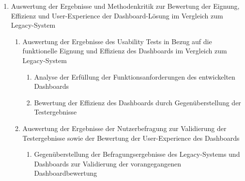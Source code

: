 \begin{enumerate}
\begin{enumerate}
\begin{enumerate}
            \item Erstellung eines Usability-Tests zur Überprüfung der identifizierten Anforderungen wie Funktionsvollständigkeit, Nutzerfreundlichkeit und Effizienz
            \item Zusammenfassung der Testergebnisse im Rahmen des Legacy-Systems
            \item Zusammenfassung der Testergebnisse im Rahmen des Dashboards
        \end{enumerate}
        \item Umsetzung einer Nutzerbefragung als zusätzliche Validierung der Nutzerfreundlichkeit und Gewährleistung der Nutzerzufriedenheit im Vergleich zum Legacy-System
        \begin{enumerate}
            \item Erstellung eines Fragebogens nach ISO 9241-110 zur Validierung der gegebenen Anforderungen wie User-Experience und Nutzerzufriedenheit
            \item Zusammenfassung der Ergebnisse des Fragebogens in Bezug auf das Legacy-System
            \item Zusammenfassung der Ergebnisse des Fragebogens in Bezug auf das Dashboard
        \end{enumerate}
    \end{enumerate}
    \item Auswertung der Ergebnisse und Methodenkritik zur Bewertung der Eignung, Effizienz und User-Experience der Dashboard-Lösung im Vergleich zum Legacy-System
    \begin{enumerate}
        \item Auswertung der Ergebnisse des Usability Tests in Bezug auf die funktionelle Eignung und Effizienz des Dashboards im Vergleich zum Legacy-System
        \begin{enumerate}
            \item Analyse der Erfüllung der Funktionsanforderungen des entwickelten Dashboards
            \item Bewertung der Effizienz des Dashboards durch Gegenüberstellung der Testergebnisse
        \end{enumerate}
        \item Auswertung der Ergebnisse der Nutzerbefragung zur Validierung der Testergebnisse sowie der Bewertung der User-Experience des Dashboards
        \begin{enumerate}
            \item Gegenüberstellung der Befragungsergebnisse des Legacy-Systems und Dashboards zur Validierung der vorangegangenen Dashboardbewertung

\end{enumerate}
\end{enumerate}
\end{enumerate}
